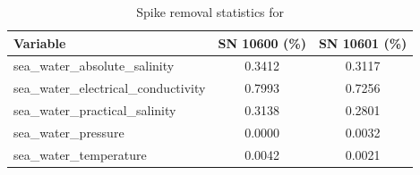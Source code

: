 \begin{table}[h]
\centering
\caption{Spike removal statistics for \projectname{} \casenumber{}}
\label{tab:str16_spike_stats}
\begin{tabular}{|l|c|c|}
\hline
Variable & SN 10600 (\%) & SN 10601 (\%) \\
\hline
sea\_water\_absolute\_salinity & 0.3412 & 0.3117 \\
sea\_water\_electrical\_conductivity & 0.7993 & 0.7256 \\
sea\_water\_practical\_salinity & 0.3138 & 0.2801 \\
sea\_water\_pressure & 0.0000 & 0.0032 \\
sea\_water\_temperature & 0.0042 & 0.0021 \\
\hline
\end{tabular}
\end{table}
